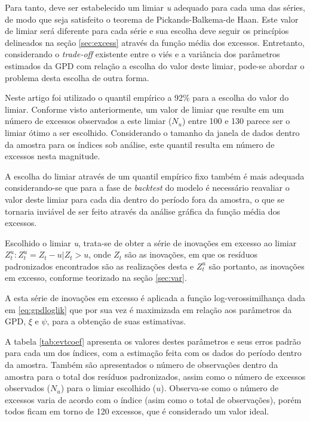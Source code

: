 \documentclass[1p]{elsarticle}
\theoremstyle{definition}
\begin{document}
Para tanto, deve ser estabelecido um limiar \emph{u} adequado para cada uma das séries, de modo que seja satisfeito o teorema de Pickands-Balkema-de Haan. Este valor de limiar será diferente para cada série e sua escolha deve seguir os princípios delineados na seção \ref{sec:excess} através da função média dos excessos. Entretanto, considerando o \emph{trade-off} existente entre o viés e a variância dos parâmetros estimados da GPD com relação a escolha do valor deste limiar, pode-se abordar o problema desta escolha de outra forma.

Neste artigo foi utilizado o quantil empírico a 92\% para a escolha do valor do limiar. Conforme visto anteriormente, um valor de limiar que resulte em um número de excessos observados a este limiar ($N_u$) entre 100 e 130 parece ser o limiar ótimo a ser escolhido. Considerando o tamanho da janela de dados dentro da amostra para os índices sob análise, este quantil resulta em número de excessos nesta magnitude.

A escolha do limiar através de um quantil empírico fixo também é mais adequada considerando-se que para a fase de \emph{backtest} do modelo é necessário reavaliar o valor deste limiar para cada dia dentro do período fora da amostra, o que se tornaria inviável de ser feito através da análise gráfica da função média dos excessos.

Escolhido o limiar \emph{u}, trata-se de obter a série de inovações em excesso ao limiar $Z^u_t:{Z^u_t = Z_t-u |Z_t > u}$, onde $Z_t$ são as inovações, em que os resíduos padronizados encontrados são as realizações desta e $Z^u_t$ são portanto, as inovações em excesso, conforme teorizado na seção \ref{sec:var}.

A esta série de inovações em excesso é aplicada a função log-verossimilhança dada em \eqref{eq:gpdloglik} que por sua vez é maximizada em relação aos parâmetros da GPD, $\xi$ e $\psi$, para a obtenção de suas estimativas.

A tabela \ref{tab:evtcoef} apresenta os valores destes parâmetros e seus erros padrão para cada um dos índices, com a estimação feita com os dados do período dentro da amostra. Também são apresentados o número de observações dentro da amostra para o total dos resíduos padronizados, assim como o número de excessos observados ($N_u$) para o limiar escolhido ($u$). Observa-se como o número de excessos varia de acordo com o índice (asim como o total de observações), porém todos ficam em torno de 120 excessos, que é considerado um valor ideal. 
\end{document}

